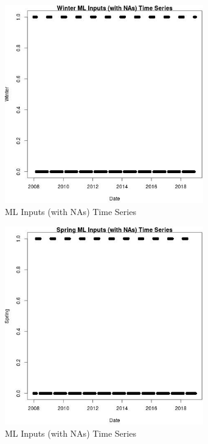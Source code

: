 \begin{figure} 
\centering  
\includegraphics[width=0.77\textwidth]{Code_Outputs/Report_ML_input_PM25_Step4_part_e_de_duplicated_aves_compiled_2019-05-21wNAs_WintervDate.jpg} 
\caption{\label{fig:Report_ML_input_PM25_Step4_part_e_de_duplicated_aves_compiled_2019-05-21wNAsWintervDate}ML Inputs (with NAs) Time Series} 
\end{figure} 
 

\begin{figure} 
\centering  
\includegraphics[width=0.77\textwidth]{Code_Outputs/Report_ML_input_PM25_Step4_part_e_de_duplicated_aves_compiled_2019-05-21wNAs_SpringvDate.jpg} 
\caption{\label{fig:Report_ML_input_PM25_Step4_part_e_de_duplicated_aves_compiled_2019-05-21wNAsSpringvDate}ML Inputs (with NAs) Time Series} 
\end{figure} 
 

